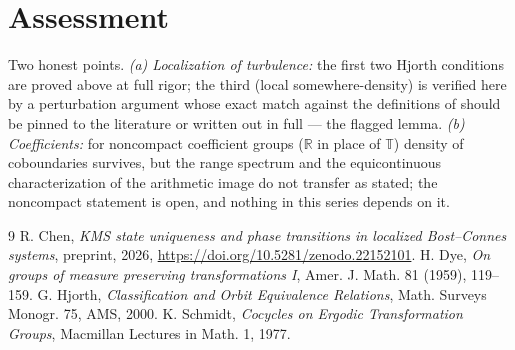\documentclass[11pt]{amsart}
\theoremstyle{remark}
\newcommand{\T}{\mathbb{T}}
\begin{document}
\section{Assessment}\label{sec:assessment}

Two honest points. \emph{(a) Localization of turbulence:} the first two Hjorth
conditions are proved above at full rigor; the third (local somewhere-density) is
verified here by a perturbation argument whose exact match against the definitions of
\cite{Hjorth} should be pinned to the literature or written out in full --- the flagged
lemma. \emph{(b) Coefficients:} for noncompact coefficient groups ($\mathbb R$ in place
of $\T$) density of coboundaries survives, but the range spectrum and the
equicontinuous characterization of the arithmetic image do not transfer as stated; the
noncompact statement is open, and nothing in this series depends on it.

\begin{thebibliography}{9}
 R. Chen, \emph{KMS state uniqueness and phase transitions in localized Bost--Connes systems}, preprint, 2026, \newline\url{https://doi.org/10.5281/zenodo.22152101}.
 H. Dye, \emph{On groups of measure preserving transformations I}, Amer. J. Math. 81 (1959), 119--159.
 G. Hjorth, \emph{Classification and Orbit Equivalence Relations}, Math. Surveys Monogr. 75, AMS, 2000.
 K. Schmidt, \emph{Cocycles on Ergodic Transformation Groups}, Macmillan Lectures in Math. 1, 1977.
\end{thebibliography}
\end{document}
